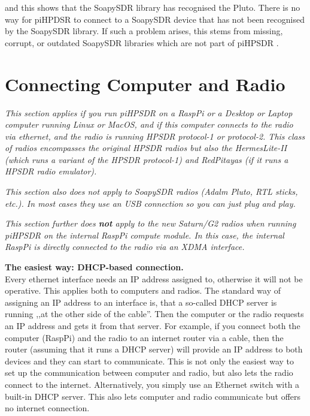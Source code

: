 \documentclass[12pt]{book}
\def\pH{pi\-HPSDR }
\begin{document}
and this shows that the SoapySDR library has recognised the Pluto.
There is no way for piHPDSR to connect
to a SoapySDR device that has not been recognised by the SoapySDR library. If such a problem arises, this
stems from missing, corrupt, or outdated SoapySDR libraries which are not part of \pH.
\chapter[Connecting the Computer and the Radio]{Connecting Computer and Radio}
\label{sec:dhcp}
\textit{This section applies if you run \pH on a
RaspPi or a Desktop or Laptop computer running Linux or MacOS, and if this computer connects to the
radio via ethernet, and the radio is running HPSDR protocol-1 or protocol-2. This class of radios
encompasses the original HPSDR radios but also the HermesLite-II (which runs a variant of the HPSDR
protocol-1) and RedPitayas (if it runs a HPSDR radio emulator).}

\textit{This section also does not apply to SoapySDR radios (Adalm Pluto, RTL sticks, etc.). In most
cases they use an USB connection so you can just plug and play.}

\textit{This section further does \textbf{not} apply to the new Saturn/G2 radios when running \pH on the
internal RaspPi compute module. In this case, the internal RaspPi
is directly connected to the radio via an XDMA interface.}


\textbf{The easiest way: DHCP-based connection.}\\
Every ethernet interface needs an IP address assigned to, otherwise it will not be operative. This applies
both to computers and radios. The standard way of assigning an IP address to an interface is, that
a so-called DHCP server is running ,,at the other side of the cable''. Then the computer or the radio
requests an IP address and gets it from that server. For example, if you connect both the computer (RaspPi)
and the radio to an internet router via a cable, then the router (assuming that it runs a DHCP server)
will provide an IP address to both devices and they can start to communicate. This is not only the
easiest way to set up the communication between computer and radio, but also lets the radio connect
to the internet. Alternatively, you simply use an Ethernet switch with a built-in DHCP server. This also
lets computer and radio communicate but offers no internet connection.
\end{document}
